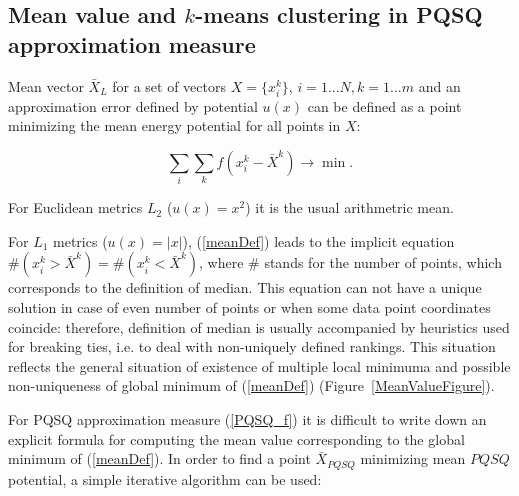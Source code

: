 \documentclass[preprint,12pt]{elsarticle}
\makeatletter
\def\BState{\State\hskip-\ALG@thistlm}
\makeatother
\begin{document}
\subsection{Mean value and $k$-means clustering in PQSQ approximation measure}

Mean vector $\bar{X}_L$  for a set of vectors $X=\{x_i^k\}$, $i=1...N, k=1...m$ and an approximation error defined by potential $u(x)$ can be defined as a point minimizing the mean energy potential for all points in  $X$:

\begin{equation}\label{meanDef}
\sum_i\sum_k f(x_i^k-\bar{X}^k) \rightarrow \min.
\end{equation}

For Euclidean metrics $L_2$ ($u(x)=x^2$) it is the usual arithmetric mean.

For $L_1$ metrics ($u(x)=|x|$), (\ref{meanDef}) leads to the implicit equation $\#(x_i^k>\bar{X}^k)=\#(x_i^k<\bar{X}^k)$, where $\#$ stands for the number of points, which corresponds to the definition of median. This equation can not have a unique solution in case of even number of points or when some data point coordinates coincide: therefore, definition of median is usually accompanied by heuristics used for breaking ties, i.e. to deal with non-uniquely defined rankings. This situation reflects the general situation of existence of multiple local minimuma and possible non-uniqueness of global minimum of (\ref{meanDef}) (Figure~\ref{MeanValueFigure}).

For PQSQ approximation measure (\ref{PQSQ_f}) it is difficult to write down an explicit formula for computing the mean value
corresponding to the global minimum of (\ref{meanDef}).
In order to find a point $\bar{X}_{PQSQ}$ minimizing mean $PQSQ$ potential, a simple iterative algorithm can be used:

\end{document}
